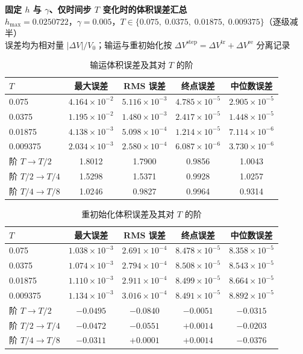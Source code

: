 \documentclass[11pt]{article}
\begin{document}
\begin{center}
{\large\bfseries 固定 $h$ 与 $\gamma$、仅时间步 $T$ 变化时的体积误差汇总}\\[3pt]
{\small $h_{\max}=0.0250722$，$\gamma=0.005$，$T\in\{0.075,\;0.0375,\;0.01875,\;0.009375\}$（逐级减半）}\\[1pt]
{\small 误差均为相对量 $|\Delta V|/V_0$；输运与重初始化按 $\Delta V^{\mathrm{step}}=\Delta V^{\mathrm{tr}}+\Delta V^{\mathrm{re}}$ 分离记录}
\end{center}

\vspace{-4pt}
\begin{table}[h]
\centering
\caption{输运体积误差及其对 $T$ 的阶}
\small
\begin{tabular}{lcccc}
\toprule
$T$ & 最大误差 & RMS 误差 & 终点误差 & 中位数误差 \\
\midrule
0.075    & $4.164\times10^{-2}$ & $5.116\times10^{-3}$ & $4.785\times10^{-5}$ & $2.905\times10^{-5}$ \\
0.0375   & $1.195\times10^{-2}$ & $1.480\times10^{-3}$ & $2.417\times10^{-5}$ & $1.448\times10^{-5}$ \\
0.01875  & $4.138\times10^{-3}$ & $5.098\times10^{-4}$ & $1.214\times10^{-5}$ & $7.114\times10^{-6}$ \\
0.009375 & $2.034\times10^{-3}$ & $2.580\times10^{-4}$ & $6.087\times10^{-6}$ & $3.730\times10^{-6}$ \\
\midrule
阶 $T\to T/2$      & 1.8012 & 1.7900 & 0.9856 & 1.0043 \\
阶 $T/2\to T/4$    & 1.5298 & 1.5371 & 0.9928 & 1.0257 \\
阶 $T/4\to T/8$    & 1.0246 & 0.9827 & 0.9964 & 0.9314 \\
\bottomrule
\end{tabular}
\end{table}

\vspace{-6pt}
\begin{table}[h]
\centering
\caption{重初始化体积误差及其对 $T$ 的阶}
\small
\begin{tabular}{lcccc}
\toprule
$T$ & 最大误差 & RMS 误差 & 终点误差 & 中位数误差 \\
\midrule
0.075    & $1.038\times10^{-3}$ & $2.691\times10^{-4}$ & $8.478\times10^{-5}$ & $8.358\times10^{-5}$ \\
0.0375   & $1.074\times10^{-3}$ & $2.794\times10^{-4}$ & $8.508\times10^{-5}$ & $8.543\times10^{-5}$ \\
0.01875  & $1.110\times10^{-3}$ & $2.911\times10^{-4}$ & $8.499\times10^{-5}$ & $8.664\times10^{-5}$ \\
0.009375 & $1.134\times10^{-3}$ & $3.016\times10^{-4}$ & $8.491\times10^{-5}$ & $8.892\times10^{-5}$ \\
\midrule
阶 $T\to T/2$      & $-0.0495$ & $-0.0840$ & $-0.0051$ & $-0.0315$ \\
阶 $T/2\to T/4$    & $-0.0472$ & $-0.0551$ & $+0.0014$ & $-0.0203$ \\
阶 $T/4\to T/8$    & $-0.0311$ & $+0.0001$ & $+0.0014$ & $-0.0376$ \\
\bottomrule
\end{tabular}
\end{table}
\end{document}
